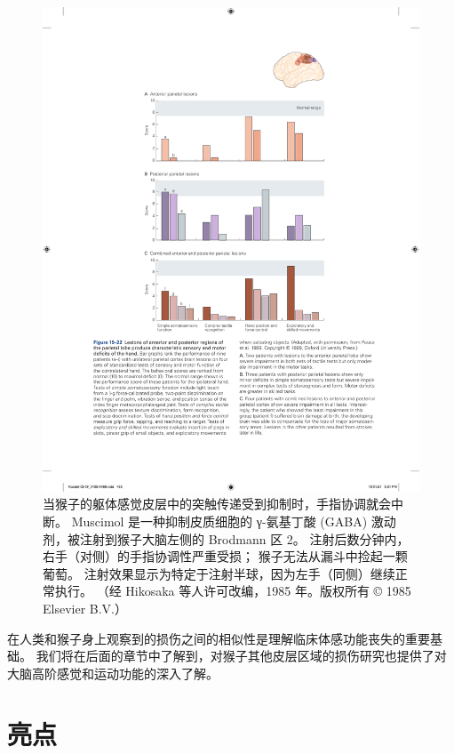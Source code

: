 \begin{figure}[htbp]
	\centering
	\includegraphics[width=1.0\linewidth]{chap19/fig_19_22}
	\caption{当猴子的躯体感觉皮层中的突触传递受到抑制时，手指协调就会中断。 
		Muscimol 是一种抑制皮质细胞的 γ-氨基丁酸 (GABA) 激动剂，被注射到猴子大脑左侧的 Brodmann 区 2。 
		注射后数分钟内，右手（对侧）的手指协调性严重受损； 猴子无法从漏斗中捡起一颗葡萄。 
		注射效果显示为特定于注射半球，因为左手（同侧）继续正常执行。 （经 Hikosaka 等人许可改编，1985 年。版权所有 © 1985 Elsevier B.V.）}
	\label{fig:19_23}
\end{figure}

在人类和猴子身上观察到的损伤之间的相似性是理解临床体感功能丧失的重要基础。 
我们将在后面的章节中了解到，对猴子其他皮层区域的损伤研究也提供了对大脑高阶感觉和运动功能的深入了解。


\section{亮点}

